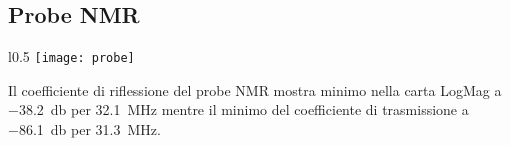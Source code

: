 \documentclass[main.tex]{subfiles}
\begin{document}
\subsection{Probe NMR}
\begin{wrapfigure}[10]{l}{0.5\textwidth} \texttt{[image: probe]} \end{wrapfigure}

Il coefficiente di riflessione del probe NMR mostra minimo  nella carta LogMag a \SI{-38.2}{\decibel} per \SI{32.1}{\mega\hertz} mentre il minimo del coefficiente di trasmissione a \SI{-86.1}{\decibel} per \SI{31.3}{\mega\hertz}.


\end{document}
